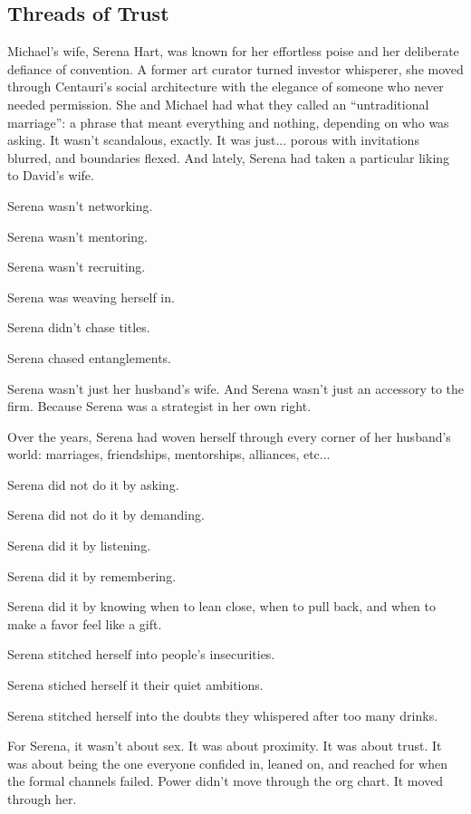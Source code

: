 \medskip

\subsection{Threads of Trust}

Michael’s wife, Serena Hart, was known for her effortless poise and her deliberate defiance of convention. 
A former art curator turned investor whisperer, she moved through Centauri’s social architecture with the 
elegance of someone who never needed permission. She and Michael had what they called an ``untraditional 
marriage'': a phrase that meant everything and nothing, depending on who was asking. It wasn’t scandalous, 
exactly. It was just... porous with invitations blurred, and boundaries flexed. And lately, Serena had taken a 
particular liking to David’s wife.

Serena wasn’t networking.  

Serena wasn’t mentoring.  

Serena wasn’t recruiting.  

Serena was weaving herself in.

Serena didn’t chase titles. 

Serena chased entanglements.  

Serena wasn’t just her husband’s wife. 
And Serena wasn’t just an accessory to the firm.  
Because Serena was a strategist in her own right. 

Over the years, Serena had woven herself through every corner of her husband’s world:  
marriages, friendships, mentorships, alliances, etc...  

Serena did not do it by asking. 

Serena did not do it by demanding.  

Serena did it by listening. 

Serena did it by remembering. 

Serena did it by knowing when to lean close, when to pull back, and when to make a favor feel like a gift.

Serena stitched herself into people’s insecurities. 

Serena stiched herself it their quiet ambitions. 

Serena stitched herself into the doubts they whispered after too many drinks.  

For Serena, it wasn’t about sex.  
It was about proximity.  
It was about trust.  
It was about being the one everyone confided in, 
leaned on, and reached for when the formal channels failed.
Power didn’t move through the org chart.  
It moved through her.  

